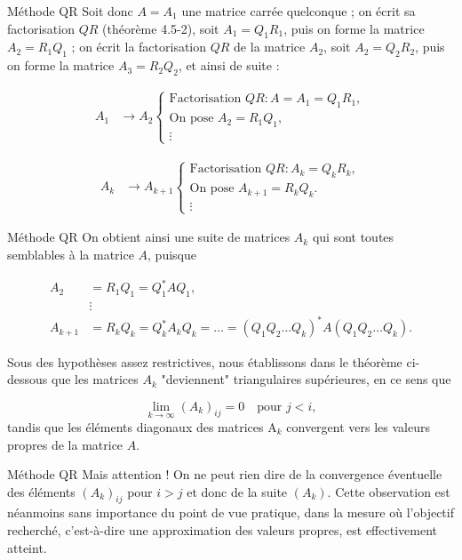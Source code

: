 \documentclass[french, 10pt]{beamer}
\theoremstyle{definition}
\begin{document}
\begin{frame}{Méthode QR}
	Soit donc $A=A_1$ une matrice carrée quelconque ; on écrit sa factorisation $QR$ (théorème 4.5-2), soit $A_1=Q_1 R_1$, puis on forme la matrice $A_2=R_1 Q_1$ ; on écrit la factorisation $QR$ de la matrice $A_2$, soit $A_2=Q_2 R_2$, puis on forme la matrice $A_3=R_2 Q_2$, et ainsi de suite :
	
	\[
	\begin{aligned}
		A_1 &\rightarrow A_2
		\begin{cases}
			\text{Factorisation } QR: A=A_1=Q_1 R_1, \\
			\text{On pose } A_2=R_1 Q_1, \\
			\vdots
		\end{cases}
	\end{aligned}
	\]
	
	\[
	\begin{aligned}
		A_k &\rightarrow A_{k+1}
		\begin{cases}
			\text{Factorisation } QR: A_k=Q_k R_k, \\
			\text{On pose } A_{k+1}=R_k Q_k.\\
			\vdots
		\end{cases}
	\end{aligned}
	\]
	
\end{frame}

\begin{frame}{Méthode QR}
	On obtient ainsi une suite de matrices $A_k$ qui sont toutes semblables à la matrice $A$, puisque  
	
	\[
	\begin{aligned}
		A_2 &= R_1 Q_1 = Q_1^* A Q_1, \\
		& \vdots \\
		A_{k+1} &= R_k Q_k = Q_k^* A_k Q_k = \dots = \left(Q_1 Q_2 \dots Q_k\right)^* A \left(Q_1 Q_2 \dots Q_k\right).
	\end{aligned}
	\]
	
	Sous des hypothèses assez restrictives, nous établissons dans le théorème ci-dessous que les matrices $A_k$ "deviennent" triangulaires supérieures, en ce sens que  
	
	\[
	\lim _{k \rightarrow \infty} (A_k)_{ij} = 0 \quad \text{pour } j<i,
	\]
	tandis que les éléments diagonaux des matrices $\mathrm{A}_k$ convergent vers les valeurs propres de la matrice $A$. 
\end{frame}

\begin{frame}{Méthode QR}
	Mais attention ! On ne peut rien dire de la convergence éventuelle des éléments $(A_k)_{ij}$ pour $i>j$ et donc de la suite $(A_k)$. Cette observation est néanmoins sans importance du point de vue pratique, dans la mesure où l'objectif recherché, c'est-à-dire une approximation des valeurs propres, est effectivement atteint.
	
	
\end{frame}
\end{document}
